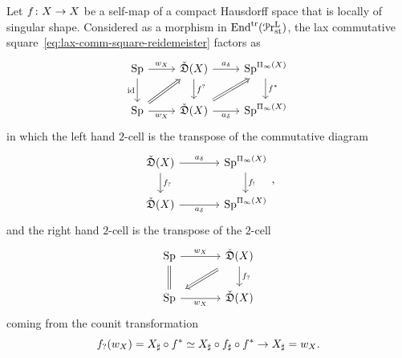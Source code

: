 \begin{prop}
  Let $f\colon X\to X$ be a self-map of a compact Hausdorff space that is locally of singular shape. Considered as a morphism in $\mathrm{End}^{\mathrm{tr}}(\mathcal{P}\mathrm{r}^{\mathrm{L}}_{\mathrm{st}})$, the lax commutative square~\eqref{eq:lax-comm-square-reidemeister} factors as
  \begin{equation}\label{eq:lax-composition-cosheaves}
\begin{tikzcd}
	\Sp & {\coShat(\tset)} & \Sp^{\ani{\tset}} \\
	\Sp & {\coShat(\tset)} & \Sp^{\ani{\tset}} 
	\arrow["{w_{\tset}}", from=1-1, to=1-2]
	\arrow["\id"', from=1-1, to=2-1]
	\arrow["{a_{\delta}}", from=1-2, to=1-3]
	\arrow["{f^?}", from=1-2, to=2-2]
	\arrow["f^{\ast}", from=1-3, to=2-3]
	\arrow[Rightarrow, from=2-2, to=1-3]
	\arrow["{w_{\tset}}"', from=2-1, to=2-2]
    \arrow[Rightarrow, from=2-1, to=1-2]
	\arrow["{a_{\delta}}"', from=2-2, to=2-3]
\end{tikzcd}
  \end{equation}
  in which the left hand $2$-cell is the transpose of the commutative diagram
  \[
    \begin{tikzcd}[column sep=large]
      \coShat (\tset ) \arrow[r,"a_\delta"] \arrow[d,"f_?"] & \Sp^{\fundgroupoid (\tset )} \arrow[d,"f_!"]\\
      \coShat (\tset ) \arrow[r,swap,"a_\delta"]   & \Sp^{\fundgroupoid (\tset )}
    \end{tikzcd},
  \]
  and the right hand $2$-cell is the transpose of the $2$-cell
  \[
    \begin{tikzcd}[column sep=large]
      \Sp \arrow[r,"w_\tset"] \arrow[d,equal] & \coShat (\tset ) \arrow[d,"f_?"]\\
      \Sp \arrow[r,swap,"w_\tset"]  \arrow[ru,Leftarrow, shorten <=5pt,shorten >=5pt]  & \coShat (\tset )
    \end{tikzcd}
  \]
  coming from the counit transformation
  \[
    f_?(w_X) = X_\sharp\circ f^*\simeq X_\sharp \circ f_\sharp\circ f^*\to X_\sharp = w_X.
  \]
\end{prop}
